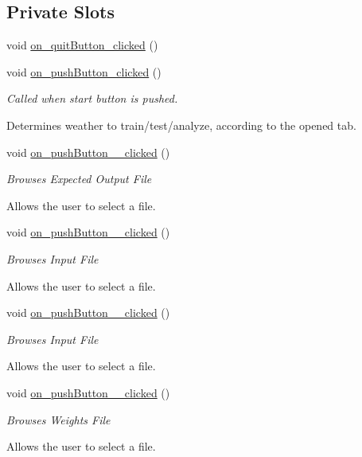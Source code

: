 \subsection*{Private Slots}
\begin{DoxyCompactItemize}
\item 
void \hyperlink{a00002_a5acc81766a1842665846092ebf0815e0}{on\-\_\-quit\-Button\-\_\-clicked} ()
\item 
void \hyperlink{a00002_a043466f485b6b75ee25ee879121c1ecc}{on\-\_\-push\-Button\-\_\-clicked} ()
\begin{DoxyCompactList}\small\item\em Called when start button is pushed.\par
 Determines weather to train/test/analyze, according to the opened tab. \end{DoxyCompactList}\item 
void \hyperlink{a00002_a09eeb721e4f861e80da92d8ed42277ee}{on\-\_\-push\-Button\-\_\-\_\-clicked} ()
\begin{DoxyCompactList}\small\item\em Browses Expected Output File\par
 Allows the user to select a file. \end{DoxyCompactList}\item 
void \hyperlink{a00002_a9a338258e3edb0d5ab1aabc26dd34d40}{on\-\_\-push\-Button\-\_\-\_\-clicked} ()
\begin{DoxyCompactList}\small\item\em Browses Input File\par
 Allows the user to select a file. \end{DoxyCompactList}\item 
void \hyperlink{a00002_a6fd99e6dc89a1f3d352c037c880ef345}{on\-\_\-push\-Button\-\_\-\_\-clicked} ()
\begin{DoxyCompactList}\small\item\em Browses Input File\par
 Allows the user to select a file. \end{DoxyCompactList}\item 
void \hyperlink{a00002_a8b08d8812751902c52d56efc45d0b58d}{on\-\_\-push\-Button\-\_\-\_\-clicked} ()
\begin{DoxyCompactList}\small\item\em Browses Weights File\par
 Allows the user to select a file. \end{DoxyCompactList}\item 

\end{DoxyCompactItemize}
